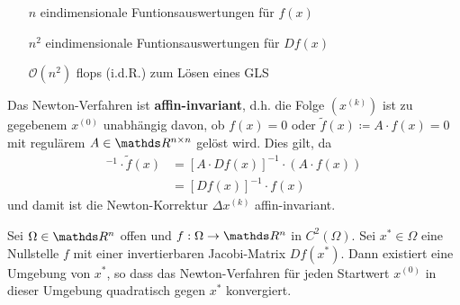 \begin{itemize}
\item[\textbf{$n$}] eindimensionale Funtionsauswertungen für $f(x)$
\item[\textbf{$n^2$}] eindimensionale Funtionsauswertungen für $Df(x)$
\item[$\mathcal{O}(n^2)$] flops (i.d.R.) zum Lösen eines GLS
\end{itemize}


\begin{Beme}
  \label{5.5.5}
  Das Newton-Verfahren ist \textbf{affin-invariant},
  d.h. die Folge $(x^{(k)})$ ist zu gegebenem $x^{(0)}$ unabhängig davon,
  ob $f(x)=0$ oder $\widetilde{f}(x)\coloneqq A\cdot f(x) =0$
  mit regulärem $A\in \Renn $ gelöst wird.
  Dies gilt, da 
  \begin{align*}
    [D\widetilde{f}(x)]^{-1} \cdot \widetilde{f}(x)
    &= [A\cdot Df(x)]^{-1} \cdot (A\cdot f(x))\\
    &= [Df(x)]^{-1} \cdot f(x)
  \end{align*}
  und damit ist die Newton-Korrektur $\Delta x^{(k)}$ affin-invariant.
\end{Beme}

\begin{Satze}
  Sei $\Omega\in\R^n$ offen und $f:\Omega\rightarrow\Ren$ in $C^2(\Omega)$.
  Sei $x^{*}\in\Omega $ eine Nullstelle $f$ mit einer invertierbaren Jacobi-Matrix $Df(x^{*})$.
  Dann existiert eine Umgebung von $x^{*}$, so dass das Newton-Verfahren 
  für jeden Startwert $x^{(0)}$ in dieser Umgebung
  quadratisch gegen $x^{*}$ konvergiert.
\end{Satze}

